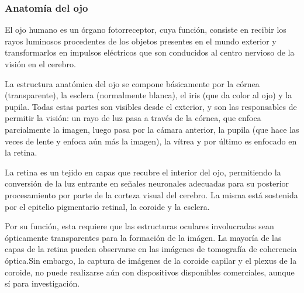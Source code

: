 		\subsubsection{Anatom\'ia del ojo}

El ojo humano es un \'organo fotorreceptor, cuya funci\'on, consiste en recibir los rayos luminosos procedentes de los objetos presentes en el mundo exterior y transformarlos en impulsos el\'ectricos que son conducidos al centro nervioso de la visi\'on en el cerebro. 

La estructura anat\'omica del ojo se compone b\'asicamente por la c\'ornea (transparente), la esclera (normalmente blanca), el iris (que da color al ojo) y la pupila. Todas estas partes son visibles desde el exterior, y son las responsables de permitir la visi\'on: un rayo de luz pasa a trav\'es de la c\'ornea, que enfoca parcialmente la imagen, luego pasa por la c\'amara anterior, la pupila (que hace las veces de lente y enfoca a\'un m\'as la imagen), la v\'itrea y por \'ultimo es enfocado en la retina.

La retina es un tejido en capas que recubre el interior del ojo, permitiendo la conversi\'on de la luz entrante en señales neuronales adecuadas para su posterior procesamiento por parte de la corteza visual del cerebro. La misma est\'a sostenida por el epitelio pigmentario retinal, la coroide y la esclera.

Por su funci\'on, esta requiere que las estructuras oculares involucradas sean \'opticamente transparentes para la formaci\'on de la im\'agen.
La mayor\'ia de las capas de la retina pueden observarse en las im\'agenes de tomografía de coherencia óptica.Sin embargo, la captura de imágenes de la coroide capilar y el plexus de la coroide, no puede realizarse aún con dispositivos disponibles comerciales, aunque sí para investigación.\cite{abramoff2010retinal}

